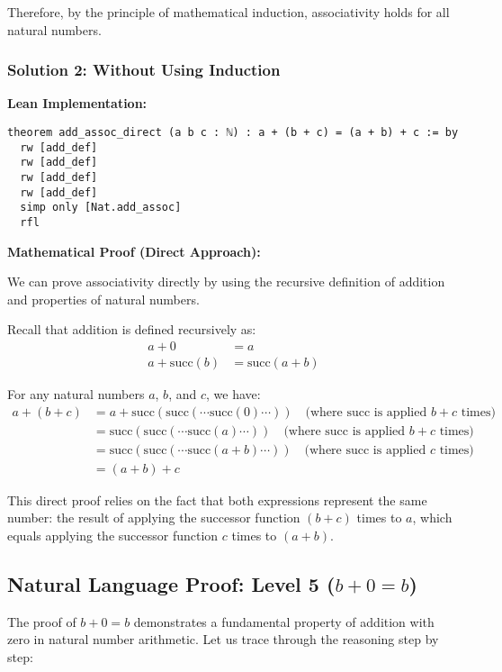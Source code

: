 \documentclass{article}
\theoremstyle{plain}
\theoremstyle{definition}
\theoremstyle{remark}
\begin{document}
Therefore, by the principle of mathematical induction, associativity holds for all natural numbers.

\subsubsection{Solution 2: Without Using Induction}

\textbf{Lean Implementation:}
\begin{verbatim}
theorem add_assoc_direct (a b c : ℕ) : a + (b + c) = (a + b) + c := by
  rw [add_def]
  rw [add_def]
  rw [add_def]
  rw [add_def]
  simp only [Nat.add_assoc]
  rfl
\end{verbatim}

\textbf{Mathematical Proof (Direct Approach):}

We can prove associativity directly by using the recursive definition of addition and properties of natural numbers.

Recall that addition is defined recursively as:
\begin{align}
a + 0 &= a \\
a + \text{succ}(b) &= \text{succ}(a + b)
\end{align}

For any natural numbers $a$, $b$, and $c$, we have:
\begin{align}
a + (b + c) &= a + \text{succ}(\text{succ}(\cdots \text{succ}(0) \cdots)) \quad \text{(where succ is applied $b+c$ times)} \\
&= \text{succ}(\text{succ}(\cdots \text{succ}(a) \cdots)) \quad \text{(where succ is applied $b+c$ times)} \\
&= \text{succ}(\text{succ}(\cdots \text{succ}(a + b) \cdots)) \quad \text{(where succ is applied $c$ times)} \\
&= (a + b) + c
\end{align}

This direct proof relies on the fact that both expressions represent the same number: the result of applying the successor function $(b + c)$ times to $a$, which equals applying the successor function $c$ times to $(a + b)$.

\subsection{Natural Language Proof: Level 5 ($b + 0 = b$)}

The proof of $b + 0 = b$ demonstrates a fundamental property of addition with zero in natural number arithmetic. Let us trace through the reasoning step by step:
\end{document}
